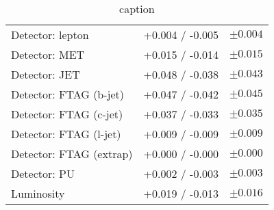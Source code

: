 \begin{table}[h]
\begin{tabular}{lrr}
    \:\:\:\: Detector: lepton         & +0.004 / -0.005 & $ \pm 0.004 $ \\
    \:\:\:\: Detector: MET            & +0.015 / -0.014 & $ \pm 0.015 $ \\
    \:\:\:\: Detector: JET            & +0.048 / -0.038 & $ \pm 0.043 $ \\
    \:\:\:\: Detector: FTAG (b-jet)   & +0.047 / -0.042 & $ \pm 0.045 $ \\
    \:\:\:\: Detector: FTAG (c-jet)   & +0.037 / -0.033 & $ \pm 0.035 $ \\
    \:\:\:\: Detector: FTAG (l-jet)   & +0.009 / -0.009 & $ \pm 0.009 $ \\
    \:\:\:\: Detector: FTAG (extrap)  & +0.000 / -0.000 & $ \pm 0.000 $ \\
    \:\:\:\: Detector: PU             & +0.002 / -0.003 & $ \pm 0.003 $ \\
    \:\:\:\: Luminosity               & +0.019 / -0.013 & $ \pm 0.016 $ \\
    \bottomrule
  \end{tabular}
\caption{caption}
\label{tab:breakdown_012L_MVAVH}
\end{table}